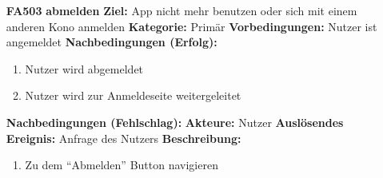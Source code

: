 \documentclass[parskip=full]{scrartcl}
\begin{document}
\begin{itemize}[nosep]
			\item[\textbf{FA503}]\textbf{abmelden}
							\newline \textbf{Ziel:} App nicht mehr benutzen oder sich mit einem anderen Kono anmelden
							\newline \textbf{Kategorie:} Primär
							\newline \textbf{Vorbedingungen:} Nutzer ist angemeldet
							\newline \textbf{Nachbedingungen (Erfolg):} 
							\begin{enumerate}[nosep]
								\item Nutzer wird abgemeldet
								\item Nutzer wird zur Anmeldeseite weitergeleitet 
							\end{enumerate}
							\textbf{Nachbedingungen (Fehlschlag):}
							\newline \textbf{Akteure:} Nutzer
							\newline \textbf{Auslösendes Ereignis:} Anfrage des Nutzers
							\newline \textbf{Beschreibung:}
							\begin{enumerate}[nosep]
								\item Zu dem “Abmelden” Button navigieren\\
							\end{enumerate}
							
		\end{itemize}
		
\end{document}
